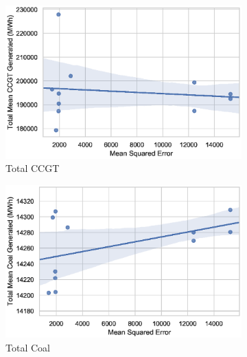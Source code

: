 \begin{figure}
	\centering
	\begin{subfigure}{0.3\textwidth}
		\includegraphics[width=\columnwidth]{Chapter5/figures/market-forecasting/results/elecsim_results/results_2/total_CCGT_mean_output.eps}
		\caption{Total CCGT}
		\label{fig:total_CCGT_mean_output}
	\end{subfigure}
	\hfil
	\begin{subfigure}{0.3\textwidth}  
		\includegraphics[width=\columnwidth]{Chapter5/figures/market-forecasting/results/elecsim_results/results_2/total_Coal_mean_output.eps}
		\caption{Total Coal}
		\label{fig:total_Coal_mean_output}
	\end{subfigure}
	\hfil
	\begin{subfigure}{0.3\textwidth}   

\end{subfigure}
\end{figure}
